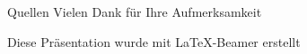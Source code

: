 \documentclass[handout,svgnames]{beamer}
\begin{document}
\section{}%
\begin{frame}{Quellen}
	Vielen Dank für Ihre Aufmerksamkeit
	
	\medskip Diese Präsentation wurde mit \LaTeX{}-Beamer erstellt
\end{frame}


%
\end{document}
